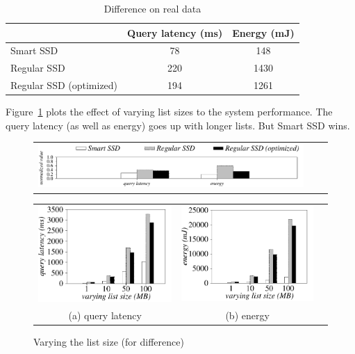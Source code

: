 \begin{table}[htbp]\small
\centering
\begin{tabular}{l|c|c}\hline\hline
& \textbf{Query latency (ms)} & \textbf{Energy (mJ)}\\\hline
Smart SSD & 78 & 148\\\hline
Regular SSD & 220 & 1430\\\hline
Regular SSD (optimized) & 194 & 1261 \\\hline\hline
\end{tabular}
\caption{Difference on real data}\label{tab:diffRealData}
\end{table}

Figure~\ref{fig:varyListSizeDifference} plots the effect of varying list sizes to the system performance.
The query latency (as well as energy) goes up with longer lists. But Smart SSD wins.

\begin{figure}[hbtp]
  \centering
    \begin{tabular}{ccc}
 \includegraphics[width=0.95\columnwidth]{figures/banner.pdf}
\end{tabular}
\renewcommand{\tabcolsep}{0.1mm}
  \begin{tabular}{ccc}
 \includegraphics[width=0.5\columnwidth]{figures/Difference-time-VaryListLen-eps-converted-to.pdf}&
  \includegraphics[width=0.5\columnwidth]{figures/Difference-energy-VaryListLen-eps-converted-to.pdf}\\
  (a) query latency & (b) energy
\end{tabular}
  \caption{Varying the list size (for difference)}
  \label{fig:varyListSizeDifference}
 \end{figure}




